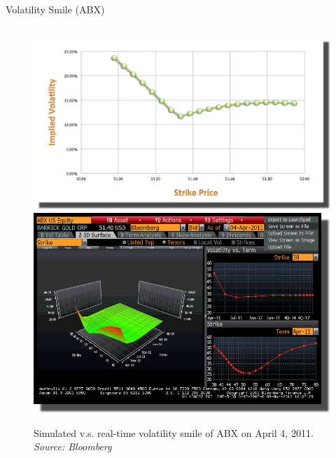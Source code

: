 \documentclass{beamer}
\begin{document}
\begin{frame}[shrink=50]{{\color{cyan}Volatility Smile ({\color{magenta}ABX})}}
\begin{columns}
\begin{column}{0.7\textwidth}
\begin{figure}[htbp]
                \centering
                \includegraphics[height=0.75\textheight]{ABX/ABX_20110404_Simulated_Volatility_Smile.png}\\
                \includegraphics[height=0.75\textheight]{ABX/ABX_20110404_B.png}\\
                \caption{Simulated v.s. real-time volatility smile of ABX on April 4, 2011. \textit{Source: Bloomberg}}
                \label{fig:ABX_VolSmile_SimvsReal}
\end{figure}
\end{column}
\end{columns}

\end{frame}
\end{document}
